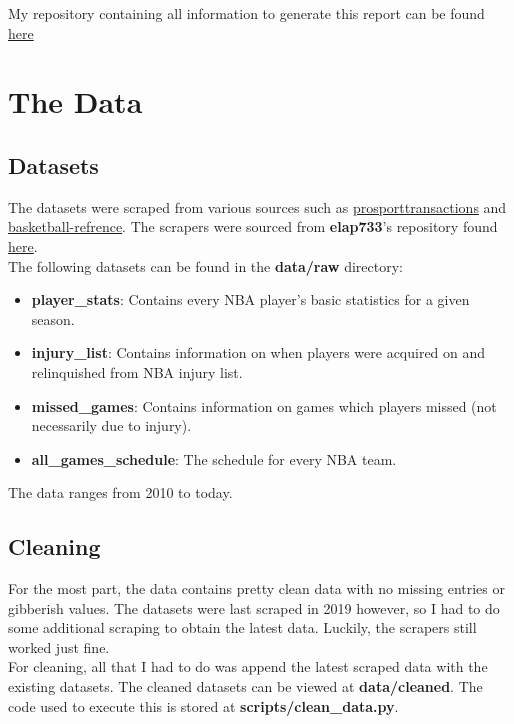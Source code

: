 \documentclass{article}
\begin{document}
My repository containing all information to generate this report
can be found \href{https://github.com/william-coulter/NBA-Injury-Predictor}{here}

\newpage

\section*{The Data}

\subsection*{Datasets}

The datasets were scraped from various sources such as
\href{https://www.prosportstransactions.com/basketball}{prosporttransactions} and
\href{https://www.basketball-reference.com/}{basketball-refrence}. The scrapers
were sourced from \textbf{elap733}'s repository found
\href{https://github.com/elap733/NBA-Injuries-Analysis/tree/master/src/d01_scrapes}{here}.\\

The following datasets can be found in the \textbf{data/raw} directory:
\begin{itemize}
    \item \textbf{player\_stats}: Contains every NBA player's basic statistics for a given season.
    \item \textbf{injury\_list}: Contains information on when players were acquired on and relinquished from NBA injury list.
    \item \textbf{missed\_games}: Contains information on games which players missed (not necessarily due to injury).
    \item \textbf{all\_games\_schedule}: The schedule for every NBA team.
\end{itemize}

The data ranges from 2010 to today.

\subsection*{Cleaning}

For the most part, the data contains pretty clean data with no missing entries
or gibberish values. The datasets were last scraped in 2019 however, so I had to
do some additional scraping to obtain the latest data. Luckily, the scrapers
still worked just fine.\\

For cleaning, all that I had to do was append the latest scraped data
with the existing datasets. The cleaned datasets can be viewed at \textbf{data/cleaned}.
The code used to execute this is stored at \textbf{scripts/clean\_data.py}.
\end{document}
